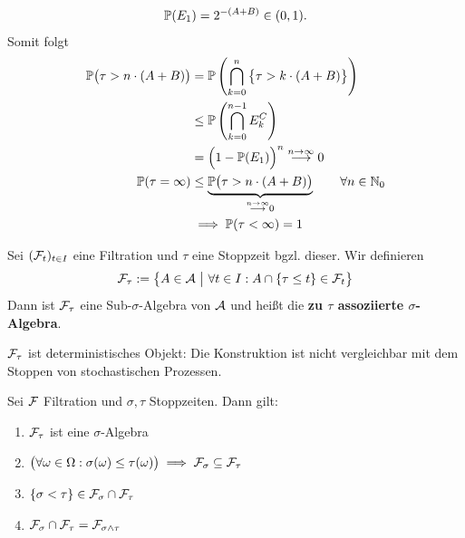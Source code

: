 \begin{beisp}
	\begin{align*}
		\P(E_1)=2^{-(A+B)}\in(0,1).
	\end{align*}
	Somit folgt
	\begin{align*}
		\P\big(\tau>n\cdot(A+B)\big)&=\P\left(\bigcap\limits_{k=0}^n\big\lbrace\tau > k\cdot (A+B)\big\rbrace\right)\\
		&\leq\P\left(\bigcap\limits_{k=0}^{n-1} E_k^C\right)\\
		&=\Big(1-\P(E_1)\Big)^n\stackrel{n\to\infty}{\longrightarrow}0\\
		\P(\tau=\infty)&\leq\underbrace{\P\big(\tau> n\cdot(A+B)\big)}_{\stackrel{n\to\infty}{\longrightarrow}0}\qquad\forall n\in\N_0\\
		&\implies
		\P(\tau<\infty)=1
	\end{align*}
\end{beisp}

\begin{defi}
	Sei $(\F_t)_{t\in I}$ eine Filtration und $\tau$ eine Stoppzeit bgzl. dieser. Wir definieren 
	\begin{align*}
		\F_\tau:=\big\lbrace A\in\A~\big|~\forall t\in I:A\cap\lbrace\tau\leq t\rbrace\in\F_t\big\rbrace
	\end{align*}
	Dann ist $\F_\tau$ eine Sub-$\sigma$-Algebra von $\A$ und heißt die \textbf{zu $\tau$ assoziierte $\sigma$-Algebra}.
\end{defi}

\begin{bemerkung}
	$\F_\tau$ ist deterministisches Objekt: Die Konstruktion ist nicht vergleichbar mit dem Stoppen von stochastischen Prozessen.
\end{bemerkung}

\setcounter{satz}{2} %
\begin{lemma}\label{lemma3.3}
	Sei $\F$ Filtration und $\sigma,\tau$ Stoppzeiten. Dann gilt:
	\begin{enumerate}[label=(\alph*)]
		\item $\F_\tau$ ist eine $\sigma$-Algebra
		\item $\begin{aligned}
			\big(\forall\omega\in\Omega:\sigma(\omega)\leq\tau(\omega)\big)\implies\F_\sigma\subseteq\F_\tau
		\end{aligned}$
		\item $\begin{aligned}
			\lbrace\sigma<\tau\rbrace\in\F_\sigma\cap\F_\tau
		\end{aligned}$
		\item $\begin{aligned}
			\F_\sigma\cap\F_\tau=\F_{\sigma\wedge\tau}
		\end{aligned}$
	\end{enumerate}
\end{lemma}

